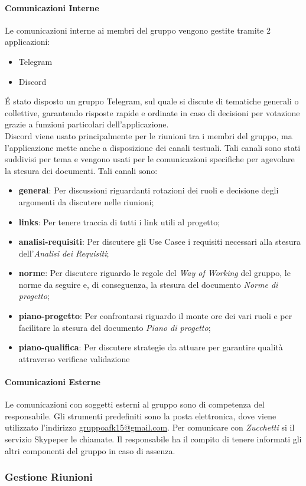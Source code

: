 \paragraph{Comunicazioni Interne}
Le comunicazioni interne ai membri del gruppo vengono gestite  tramite 2 applicazioni:
\begin{itemize}
	\item Telegram\glo
	\item Discord\glo
\end{itemize}
\'E stato disposto un gruppo Telegram, sul quale si discute di tematiche generali o collettive, garantendo risposte rapide e ordinate in caso di decisioni per votazione grazie a funzioni particolari dell'applicazione. \\
Discord viene usato principalmente per le riunioni tra i membri del gruppo, ma l'applicazione mette anche a disposizione dei canali testuali. Tali canali sono stati suddivisi per tema e vengono usati per le comunicazioni specifiche per agevolare la stesura dei documenti. Tali canali sono:
\begin{itemize}
	\item \textbf{general}: Per discussioni riguardanti rotazioni dei ruoli e decisione degli argomenti da discutere nelle riunioni;
	\item \textbf{links}: Per tenere traccia di tutti i link utili al progetto;
	\item \textbf{analisi-requisiti}: Per discutere gli Use Case\glo e i requisiti necessari alla stesura dell'\textit{Analisi dei Requisiti};
	\item \textbf{norme}: Per discutere riguardo le regole del \textit{Way of Working} del gruppo, le norme da seguire e, di conseguenza, la stesura del documento \textit{Norme di progetto}\glo;
	\item \textbf{piano-progetto}: Per confrontarsi riguardo il monte ore dei vari ruoli e per facilitare la stesura del documento \textit{Piano di progetto}\glo;
	\item \textbf{piano-qualifica}: Per discutere strategie da attuare per garantire qualità attraverso verifica\glo e validazione\glo
\end{itemize}
\paragraph{Comunicazioni Esterne}
Le comunicazioni con soggetti esterni al gruppo sono di competenza del responsabile. Gli strumenti predefiniti sono la posta elettronica, dove viene utilizzato l'indirizzo \href{mailto:gruppoafk15@gmail.com}{gruppoafk15@gmail.com}.
Per comunicare con \textit{Zucchetti} si il servizio Skype\glo per le chiamate. Il responsabile ha il compito di tenere informati gli altri componenti
del gruppo in caso di assenza.

\subsubsection{Gestione Riunioni}



